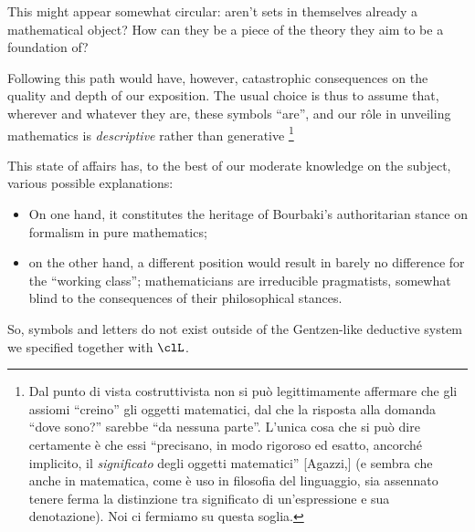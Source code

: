 This might appear somewhat circular: aren't sets in themselves already a mathematical object? How can they be a piece of the theory they aim to be a foundation of?

Following this path would have, however, catastrophic consequences on the quality and depth of our exposition. The usual choice is thus to assume that, wherever and whatever they are, these symbols ``are'', and our r\^ole in unveiling mathematics is \emph{descriptive} rather than generative \footnote{Dal punto di vista costruttivista non si può legittimamente affermare che gli assiomi ``creino'' gli oggetti matematici, dal che la risposta alla domanda ``dove sono?'' sarebbe ``da nessuna parte''. L'unica cosa che si può dire certamente è che essi ``precisano, in modo rigoroso ed esatto, ancorché implicito, il \emph{significato} degli oggetti matematici'' [Agazzi,\cite{?}] (e sembra che anche in matematica, come è uso in filosofia del linguaggio, sia assennato tenere ferma la distinzione tra significato di un'espressione e sua denotazione). Noi ci fermiamo su questa soglia.}

This state of affairs has, to the best of our moderate knowledge on the subject, various possible explanations:
\begin{itemize}
	\item On one hand, it constitutes the heritage of Bourbaki's authoritarian stance on formalism in pure mathematics;
	\item on the other hand, a different position would result in barely no difference for the ``working class''; mathematicians are irreducible pragmatists, somewhat blind to the consequences of their philosophical stances.
\end{itemize}
So, symbols and letters do not exist outside of the Gentzen-like deductive system we specified together with $\clL$.


